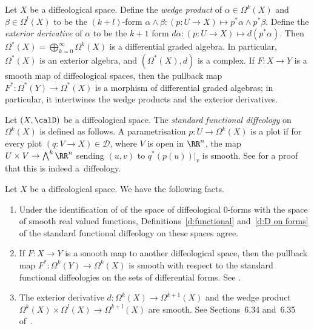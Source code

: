 \begin{Remark}
\label{alg iso}
Let $X$ be a dif\/feological space.
Def\/ine the \emph{wedge product}
of $ \alpha \in \Omega^k(X) $ and $ \beta \in \Omega^l(X) $
to be the $(k+l)$-form
$\alpha \wedge \beta \colon (p \colon U \to X)
 \mapsto p^* \alpha \wedge p^* \beta$.
Def\/ine the \emph{exterior derivative} of $\alpha$
to be the $k+1$ form
$d\alpha \colon (p \colon U \to X) \mapsto d (p^*\alpha)$.
Then $\Omega^*(X)=\bigoplus_{k=0}^\infty\Omega^k(X)$
is a dif\/ferential graded algebra.
In particular, $\Omega^*(X)$ is an exterior algebra,
and $(\Omega^*(X),d)$ is a complex.
If $F \colon X \to Y$ is a smooth map of dif\/feological spaces,
then the pullback map $F^* \colon \Omega^*(Y) \to \Omega^*(X)$
is a morphism of dif\/ferential graded algebras;
in particular,
it intertwines the wedge products and the exterior derivatives.
\end{Remark}

\begin{Definition}
\label{d:D on forms}
Let $(X,\calD)$ be a dif\/feological space.
The \emph{standard functional diffeology} on $\Omega^k(X)$
is def\/ined as follows.
A parametrisation $p \colon U \to \Omega^k(X)$ is a plot
if for every plot $(q \colon V \to X) \in \mathcal{D}$,
where $V$ is open in $\RR^n$, the map $U \times V \to \bigwedge^k \RR^n$
sending $(u,v)$ to $q^*(p(u))|_v$ is smooth.
See \cite[Section~6.29]{iglesias} for a proof that this is indeed a~dif\/feology.
\end{Definition}

\begin{Remark}\label{r:formfacts}
Let $X$ be a dif\/feological space.
We have the following facts.
\begin{enumerate}\itemsep=0pt

\item %
Under the identif\/ication of 
of the space of dif\/feological $0$-forms
with the space of smooth real valued functions,
Def\/initions~\ref{d:functional} and~\ref{d:D on forms}
of the standard functional dif\/feology on these spaces agree.

\item \label{f:pullback is sm}
If $F \colon X \to Y$ is a smooth map to another dif\/feological space,
then the pullback map $F^* \colon \Omega^k(Y) \to \Omega^k(X)$
is smooth with respect to the standard functional dif\/feologies
on the sets of dif\/ferential forms.
See \cite[Section~6.32]{iglesias}.

\item
The exterior derivative
$d \colon \Omega^k(X)\to\Omega^{k+1}(X)$ and the wedge product
$ \Omega^k (X) \times \Omega^l (X) \to \Omega^{k+l} (X)$ are smooth.
See Sections~6.34 and~6.35 of~\cite{iglesias}.
\end{enumerate}
\end{Remark}

